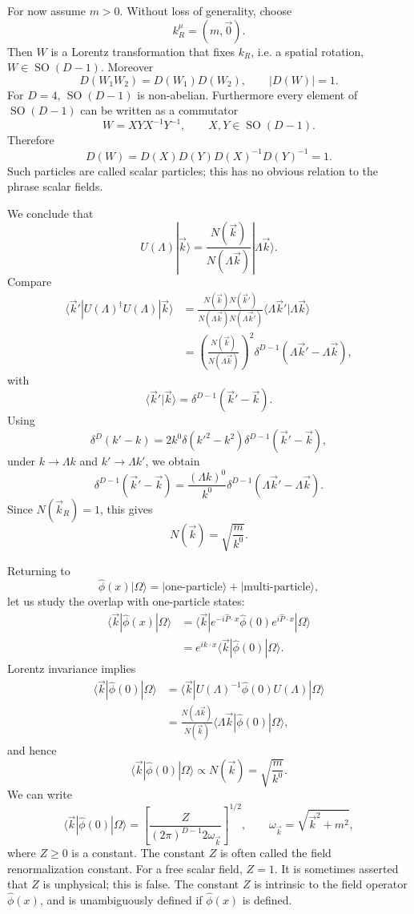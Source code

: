 For now assume \(m>0\). Without loss of generality, choose
\[
  k_R^\mu=(m,\vec 0).
\]
Then \(W\) is a Lorentz transformation that fixes \(k_R\), i.e. a spatial
rotation, \(W\in \operatorname{SO}(D-1)\). Moreover
\[
  D(W_1W_2)=D(W_1)D(W_2),
  \qquad
  |D(W)|=1.
\]
For \(D=4\), \(\operatorname{SO}(D-1)\) is non-abelian. Furthermore every
element of \(\operatorname{SO}(D-1)\) can be written as a commutator
\[
  W=XYX^{-1}Y^{-1},
  \qquad
  X,Y\in\operatorname{SO}(D-1).
\]
Therefore
\[
  D(W)=D(X)D(Y)D(X)^{-1}D(Y)^{-1}=1.
\]
Such particles are called scalar particles; this has no obvious relation to
the phrase scalar fields.

We conclude that
\[
  U(\Lambda)|\vec k\rangle
  =
  \frac{N(\vec k)}{N(\Lambda\vec k)}|\Lambda\vec k\rangle.
\]
Compare
\[
\begin{aligned}
  \langle\vec k'|U(\Lambda)^\dagger U(\Lambda)|\vec k\rangle
  &=
  \frac{N(\vec k)N(\vec k')}
       {N(\Lambda\vec k)N(\Lambda\vec k')}
  \langle\Lambda\vec k'|\Lambda\vec k\rangle  \\
  &=
  \left(\frac{N(\vec k)}{N(\Lambda\vec k)}\right)^2
  \delta^{D-1}(\Lambda\vec k'-\Lambda\vec k),
\end{aligned}
\]
with
\[
  \langle\vec k'|\vec k\rangle
  =
  \delta^{D-1}(\vec k'-\vec k).
\]
Using
\[
  \delta^D(k'-k)
  =
  2k^0\delta(k'^2-k^2)\delta^{D-1}(\vec k'-\vec k),
\]
under \(k\to\Lambda k\) and \(k'\to\Lambda k'\), we obtain
\[
  \delta^{D-1}(\vec k'-\vec k)
  =
  \frac{(\Lambda k)^0}{k^0}
  \delta^{D-1}(\Lambda\vec k'-\Lambda\vec k).
\]
Since \(N(\vec k_R)=1\), this gives
\[
  N(\vec k)=\sqrt{\frac{m}{k^0}}.
\]

Returning to
\[
  \hat\phi(x)|\Omega\rangle
  =
  |\text{one-particle}\rangle
  +
  |\text{multi-particle}\rangle,
\]
let us study the overlap with one-particle states:
\[
\begin{aligned}
  \langle\vec k|\hat\phi(x)|\Omega\rangle
  &=
  \langle\vec k|
  e^{-i\hat P\cdot x}\hat\phi(0)e^{i\hat P\cdot x}
  |\Omega\rangle  \\
  &=
  e^{ik\cdot x}
  \langle\vec k|\hat\phi(0)|\Omega\rangle .
\end{aligned}
\]
Lorentz invariance implies
\[
\begin{aligned}
  \langle\vec k|\hat\phi(0)|\Omega\rangle
  &=
  \langle\vec k|U(\Lambda)^{-1}\hat\phi(0)U(\Lambda)|\Omega\rangle  \\
  &=
  \frac{N(\Lambda\vec k)}{N(\vec k)}
  \langle\Lambda\vec k|\hat\phi(0)|\Omega\rangle,
\end{aligned}
\]
and hence
\[
  \langle\vec k|\hat\phi(0)|\Omega\rangle
  \propto
  N(\vec k)
  =
  \sqrt{\frac{m}{k^0}}.
\]
We can write
\[
  \langle\vec k|\hat\phi(0)|\Omega\rangle
  =
  \left[
    \frac{Z}{(2\pi)^{D-1}2\omega_{\vec k}}
  \right]^{1/2},
  \qquad
  \omega_{\vec k}=\sqrt{\vec k^2+m^2},
\]
where \(Z\ge 0\) is a constant. The constant \(Z\) is often called the
field renormalization constant. For a free scalar field, \(Z=1\). It is
sometimes asserted that \(Z\) is unphysical; this is false. The constant \(Z\)
is intrinsic to the field operator \(\hat\phi(x)\), and is unambiguously
defined if \(\hat\phi(x)\) is defined.

